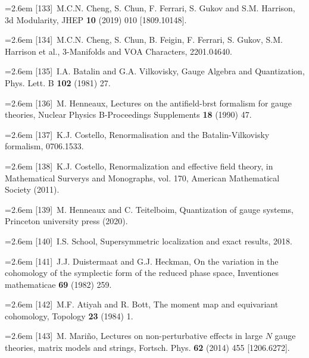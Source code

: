 \par\noindent\hangindent=2.6em [133]~M.C.N. Cheng, S. Chun, F. Ferrari, S. Gukov and S.M. Harrison, 3d Modularity, JHEP \textbf{10} (2019) 010 [1809.10148].

\par\noindent\hangindent=2.6em [134]~M.C.N. Cheng, S. Chun, B. Feigin, F. Ferrari, S. Gukov, S.M. Harrison et al., 3-Manifolds and VOA Characters, 2201.04640.

\par\noindent\hangindent=2.6em [135]~I.A. Batalin and G.A. Vilkovisky, Gauge Algebra and Quantization, Phys. Lett. B \textbf{102} (1981) 27.

\par\noindent\hangindent=2.6em [136]~M. Henneaux, Lectures on the antifield-brst formalism for gauge theories, Nuclear Physics B-Proceedings Supplements \textbf{18} (1990) 47.

\par\noindent\hangindent=2.6em [137]~K.J. Costello, Renormalisation and the Batalin-Vilkovisky formalism, 0706.1533.

\par\noindent\hangindent=2.6em [138]~K.J. Costello, Renormalization and effective field theory, in Mathematical Surverys and Monographs, vol. 170, American Mathematical Society (2011).


\par\noindent\hangindent=2.6em [139]~M. Henneaux and C. Teitelboim, Quantization of gauge systems, Princeton university press (2020).

\par\noindent\hangindent=2.6em [140]~I.S. School, Supersymmetric localization and exact results, 2018.

\par\noindent\hangindent=2.6em [141]~J.J. Duistermaat and G.J. Heckman, On the variation in the cohomology of the symplectic form of the reduced phase space, Inventiones mathematicae \textbf{69} (1982) 259.

\par\noindent\hangindent=2.6em [142]~M.F. Atiyah and R. Bott, The moment map and equivariant cohomology, Topology \textbf{23} (1984) 1.

\par\noindent\hangindent=2.6em [143]~M. Mariño, Lectures on non-perturbative effects in large $N$ gauge theories, matrix models and strings, Fortsch. Phys. \textbf{62} (2014) 455 [1206.6272].

